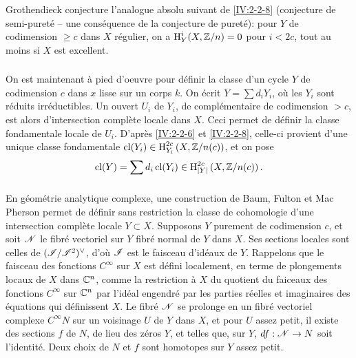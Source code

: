 {\subsubsection{}\label{IV:2-2-9}

Grothendieck conjecture l'analogue absolu suivant de \ref{IV:2-2-8} (conjecture 
de semi-puret\'e -- une cons\'equence de la conjecture de puret\'e): pour $Y$ 
de codimension $\geqslant c$ dans $X$ r\'egulier, on a $\operatorname{H}_Y^i(X,\mathbb{Z}/n)=0$ pour 
$i<2 c$, tout au moins si $X$ est excellent. 





\subsubsection{}\label{IV:2-2-10}

On est maintenant \`a pied d'oeuvre pour d\'efinir la classe d'un cycle $Y$ de 
codimension $c$ dans $x$ lisse sur un corps $k$. On \'ecrit $Y=\sum d_i Y_i$, 
o\`u les $Y_i$ sont r\'eduits irr\'eductibles. Un ouvert $U_i$ de $Y_i$, de 
compl\'ementaire de codimension $>c$, est alors d'intersection compl\`ete 
locale dans $X$. Ceci permet de d\'efinir la classe fondamentale locale de 
$U_i$. D'apr\`es \ref{IV:2-2-6} et \ref{IV:2-2-8}, celle-ci provient d'une 
unique classe fondamentale $\operatorname{cl}(Y_i)\in \operatorname{H}_{Y_i}^{2 c}\left(X,\mathbb{Z}/n(c)\right)$, 
et on pose 
\[
  \operatorname{cl}(Y) = \sum d_i \operatorname{cl}(Y_i) \in \operatorname{H}_{|Y|}^{2 c}\left(X,\mathbb{Z}/n(c)\right) \text{.}
\]





\subsubsection{}\label{IV:2-2-11}

En g\'eom\'etrie analytique complexe, une construction de Baum, Fulton et 
Mac Pherson \cite{bfm75} permet de d\'efinir sans restriction la classe de 
cohomologie d'une intersection compl\`ete locale $Y\subset X$. Supposons $Y$ 
purement de codimension $c$, et soit $\mathscr{N}$ le fibr\'e vectoriel sur $Y$ fibr\'e 
normal de $Y$ dans $X$. Ses sections locales sont celles de $(\mathscr{I}/\mathscr{I}^2)^\vee$, 
d'o\`u $\mathscr{I}$ est le faisceau d'id\'eaux de $Y$. Rappelons que le faisceau des 
fonctions $C^\infty$ sur $X$ est d\'efini localement, en terme de plongements 
locaux de $X$ dans $\mathbb{C}^n$, comme la restriction \`a $X$ du quotient du 
faiceaux des fonctions $C^\infty$ sur $\mathbb{C}^n$ par l'id\'eal engendr\'e par les 
parties r\'eelles et imaginaires des \'equations qui d\'efinissent $X$. Le 
fibr\'e $\mathscr{N}$ se prolonge en un fibr\'e vectoriel complexe $C^\infty N$ sur un 
voisinage $U$ de $Y$ dans $X$, et pour $U$ assez petit, il existe des sections 
$f$ de $N$, de lieu des z\'eros $Y$, et telles que, sur $Y$, $d f:\mathscr{N}\to N$ 
soit l'identit\'e. Deux choix de $N$ et $f$ sont homotopes sur $Y$ assez petit. 

}
